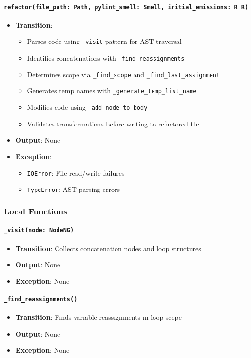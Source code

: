 \documentclass[12pt, titlepage]{article}
\begin{document}
  \paragraph{\texttt{refactor(file\_path: Path, pylint\_smell: Smell, initial\_emissions: 
  R
  R)}}
  \begin{itemize}
  \item \textbf{Transition}:
  \begin{itemize}
  \item Parses code using \texttt{\_visit} pattern for AST traversal
  \item Identifies concatenations with \texttt{\_find\_reassignments}
  \item Determines scope via \texttt{\_find\_scope} and \texttt{\_find\_last\_assignment}
  \item Generates temp names with \texttt{\_generate\_temp\_list\_name}
  \item Modifies code using \texttt{\_add\_node\_to\_body}
  \item Validates transformations before writing to refactored file
  \end{itemize}
  \item \textbf{Output}: None
  \item \textbf{Exception}:
  \begin{itemize}
  \item \texttt{IOError}: File read/write failures
  \item \texttt{TypeError}: AST parsing errors
  \end{itemize}
  \end{itemize}
  
  \subsubsection{Local Functions}
  
  \paragraph{\texttt{\_visit(node: NodeNG)}}
  \begin{itemize}
  \item \textbf{Transition}: Collects concatenation nodes and loop structures
  \item \textbf{Output}: None
  \item \textbf{Exception}: None
  \end{itemize}
  
  \paragraph{\texttt{\_find\_reassignments()}}
  \begin{itemize}
  \item \textbf{Transition}: Finds variable reassignments in loop scope
  \item \textbf{Output}: None
  \item \textbf{Exception}: None
  \end{itemize}
  
\end{document}
